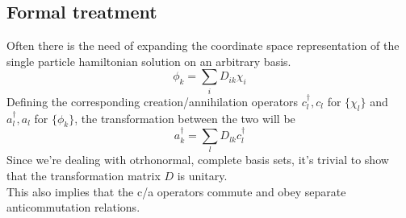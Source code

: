 \subsection{Formal treatment}
Often there is the need of expanding the coordinate space representation of the single particle hamiltonian solution on an arbitrary basis.
\begin{equation}
    \phi_k = \sum_i D_{ik} \chi_i
\end{equation}
Defining the corresponding creation/annihilation operators $c_l^\dagger, c_l$ for $\{\chi_l\}$ and $a_l^\dagger, a_l$ for $\{\phi_k\}$, the transformation between the two will be
\begin{equation}
   a_k^\dagger = \sum_l D_{lk} c_l^\dagger
\end{equation}
Since we're dealing with otrhonormal, complete basis sets, it's trivial to show that the transformation matrix $D$ is unitary.
\\This also implies that the c/a operators commute and obey separate anticommutation relations.
